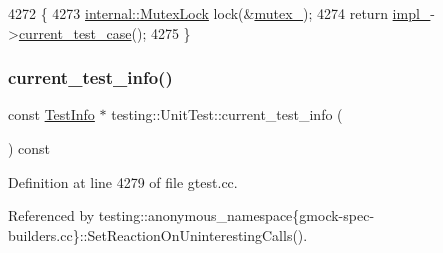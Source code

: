 \begin{DoxyCode}
4272                                  \{
4273   \hyperlink{namespacetesting_1_1internal_a08b187c6cc4e28400aadf9a32fccc8de}{internal::MutexLock} lock(&\hyperlink{classtesting_1_1UnitTest_abb94ef45cf0ab43be81ac6d5b1364132}{mutex\_});
4274   \textcolor{keywordflow}{return} \hyperlink{classtesting_1_1UnitTest_a834685f92009d21b21a7307f4cbfb6e5}{impl\_}->\hyperlink{classtesting_1_1internal_1_1UnitTestImpl_ae1f98925197cf344a23a7400deeee4dc}{current\_test\_case}();
4275 \}
\end{DoxyCode}
\mbox{\label{classtesting_1_1UnitTest_a088eaf814a33085ace3d881d22e6bdea}} 
\subsubsection{\texorpdfstring{current\+\_\+test\+\_\+info()}{current\_test\_info()}}
{\footnotesize\ttfamily const \hyperlink{classtesting_1_1TestInfo}{Test\+Info} $\ast$ testing\+::\+Unit\+Test\+::current\+\_\+test\+\_\+info (\begin{DoxyParamCaption}{ }\end{DoxyParamCaption}) const}



Definition at line 4279 of file gtest.\+cc.



Referenced by testing\+::anonymous\+\_\+namespace\{gmock-\/spec-\/builders.\+cc\}\+::\+Set\+Reaction\+On\+Uninteresting\+Calls().


